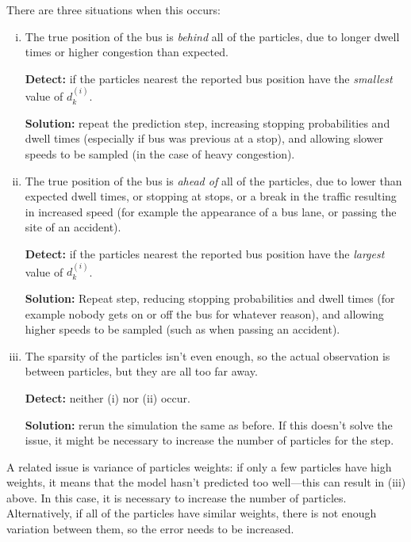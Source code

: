 \documentclass[10pt,a4paper]{article}
\begin{document}
There are three situations when this occurs:
\begin{enumerate}[(i)]
\item 
  The true position of the bus is \emph{behind} all of the particles, due to longer dwell times
  or higher congestion than expected.

  \textbf{Detect:} if the particles nearest the reported bus position have the \emph{smallest}
  value of $d_k^{(i)}$.

  \textbf{Solution:} repeat the prediction step, increasing stopping probabilities and dwell times
  (especially if bus was previous at a stop),
  and allowing slower speeds to be sampled (in the case of heavy congestion).

\item 
  The true position of the bus is \emph{ahead of} all of the particles, due to lower than expected dwell
  times, or stopping at stops, or a break in the traffic resulting in increased speed (for example the
  appearance of a bus lane, or passing the site of an accident).

  \textbf{Detect:} if the particles nearest the reported bus position have the \emph{largest}
  value of $d_k^{(i)}$.

  \textbf{Solution:} Repeat step, reducing stopping probabilities and dwell times (for example nobody gets on or off 
  the bus for whatever reason), 
  and allowing higher speeds to be sampled (such as when passing an accident).

\item 
  The sparsity of the particles isn't even enough, so the actual observation is between particles, but they 
  are all too far away.

  \textbf{Detect:} neither (i) nor (ii) occur.

  \textbf{Solution:} rerun the simulation the same as before. If this doesn't solve the issue, it might be necessary
  to increase the number of particles for the step.
\end{enumerate}

A related issue is variance of particles weights: if only a few particles have high weights, it means that 
the model hasn't predicted too well---this can result in (iii) above. 
In this case, it is necessary to increase the number of particles.
Alternatively, if all of the particles have similar weights, there is not enough variation between them,
so the error needs to be increased.
\end{document}
